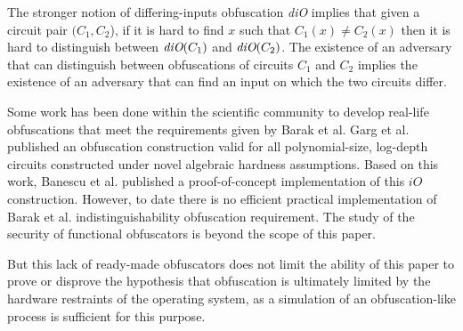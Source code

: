 \par
The stronger notion of differing-inputs obfuscation \emph{diO} implies that given
a circuit pair $(C_1, C_2$), if it is hard to find $x$ such that $C_1(x) \neq C_2(x)$
then it is hard to distinguish between $\emph{diO}(C_1)$ and $\emph{diO}(C_2)$\cite{dio}.
The existence of an adversary that can distinguish between
obfuscations of circuits $C_1$ and $C_2$ implies the existence of an adversary
that can find an input on which the two circuits differ\cite{barak}.
\par
Some work has been done within the scientific community to develop real-life
obfuscations that meet the requirements given by Barak et al. Garg et al.\cite{garg}
published an obfuscation construction valid for all polynomial-size, log-depth
circuits constructed under novel algebraic hardness assumptions. Based on this
work, Banescu et al.\cite{tum} published a proof-of-concept implementation of
this $iO$ construction.
However, to date there is no efficient practical implementation of Barak et al.\cite{barak}
indistinguishability obfuscation requirement. The study of the security of
functional obfuscators is beyond the scope of this paper.
\par
But this lack of ready-made obfuscators does not limit the ability of this paper
to prove or disprove the hypothesis that obfuscation is ultimately limited by the
hardware restraints of the operating system, as a simulation of an obfuscation-like
process is sufficient for this purpose.
